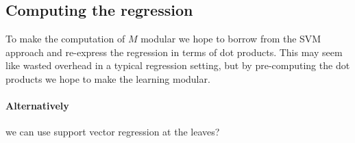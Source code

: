 \documentclass{article}
\begin{document}
\subsection{Computing the regression}
To make the computation of $M$ modular we hope to borrow from the SVM approach and re-express the regression in terms of dot products.
This may seem like wasted overhead in a typical regression setting, but by pre-computing the dot products we hope to make the learning modular.

\paragraph{Alternatively} we can use support vector regression at the leaves?
\end{document}
